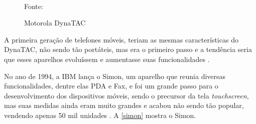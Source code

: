 \begin{figure}[!htpb]
	\centering
	\caption{Motorola DynaTAC}
	\\
	{\footnotesize Fonte: \cite{motorola_dynatac}}
	\label{motorola}
\end{figure}

A primeira geração de telefones móveis, teriam as mesmas características do DynaTAC, não sendo tão portáteis, mas era o primeiro passo e a tendência seria que esses aparelhos evoluíssem e aumentasse suas funcionalidades \cite{historia_mobile2}.

No ano de 1994, a IBM lança o Simon, um aparelho que reunia diversas funcionalidades, dentre elas \ac{PDA} e Fax, e foi um grande passo para o desenvolvimento dos dispositivos móveis, sendo o precursor da tela \textit{touchscreen}, mas suas medidas ainda eram muito grandes e acabou não sendo tão popular, vendendo apenas 50 mil unidades \cite{historia_mobile}.  A \autoref{simon}
mostra o Simon.

